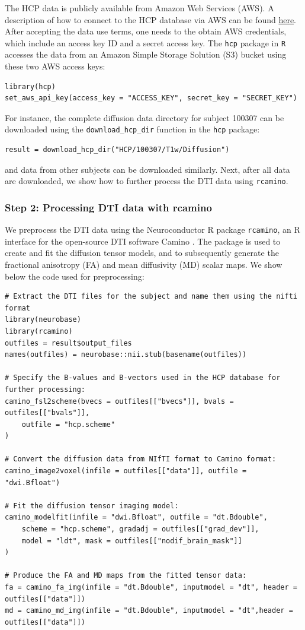 \documentclass[]{elsarticle} %
\begin{document}
The HCP data is publicly available from Amazon Web Services (AWS). A description of how to connect to the HCP database via AWS can be found \href{https://wiki.humanconnectome.org/display/PublicData/How+To+Connect+to+Connectome+Data+via+AWS}{here}.  After accepting the data use terms, one needs to the obtain AWS credentials, which include an access key ID and a secret access key. The \texttt{hcp} package in \texttt{R} accesses the data from an Amazon Simple Storage Solution (S3) bucket using these two AWS access keys:

\color{blue}
\begin{verbatim}
library(hcp)
set_aws_api_key(access_key = "ACCESS_KEY", secret_key = "SECRET_KEY")
\end{verbatim}
\color{black}
For instance, the complete diffusion data directory for subject 100307 can be downloaded using the \verb"download_hcp_dir" function in the \texttt{hcp} package:
\color{blue}
\begin{verbatim}
result = download_hcp_dir("HCP/100307/T1w/Diffusion")
\end{verbatim}
\color{black}
and data from other subjects can be downloaded similarly. Next, after all data are downloaded, we show how to further process the DTI data using \texttt{rcamino}. 

\subsubsection{Step 2: Processing DTI data with rcamino}

We preprocess the DTI data using the Neuroconductor R package \texttt{rcamino}, an R interface for the open-source DTI software Camino \citep{camino}. The package is used to create and fit the diffusion tensor models, and to subsequently generate the fractional anisotropy (FA) and mean diffusivity (MD) scalar maps. We show below the code used for preprocessing: 

\color{blue}
\begin{verbatim}
# Extract the DTI files for the subject and name them using the nifti format
library(neurobase)
library(rcamino)
outfiles = result$output_files
names(outfiles) = neurobase::nii.stub(basename(outfiles))

# Specify the B-values and B-vectors used in the HCP database for further processing:
camino_fsl2scheme(bvecs = outfiles[["bvecs"]], bvals = outfiles[["bvals"]],
    outfile = "hcp.scheme"
)

# Convert the diffusion data from NIfTI format to Camino format:
camino_image2voxel(infile = outfiles[["data"]], outfile = "dwi.Bfloat")

# Fit the diffusion tensor imaging model:
camino_modelfit(infile = "dwi.Bfloat", outfile = "dt.Bdouble", 
    scheme = "hcp.scheme", gradadj = outfiles[["grad_dev"]],
    model = "ldt", mask = outfiles[["nodif_brain_mask"]]
)

# Produce the FA and MD maps from the fitted tensor data:
fa = camino_fa_img(infile = "dt.Bdouble", inputmodel = "dt", header = outfiles[["data"]])
md = camino_md_img(infile = "dt.Bdouble", inputmodel = "dt",header = outfiles[["data"]])
\end{verbatim}
\color{black}
\end{document}
